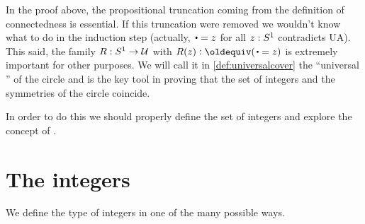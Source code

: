 In the proof above, the propositional truncation coming 
from the definition of connectedness is essential.
If this truncation were removed we wouldn't know what to do in
the induction step (actually, ${\base=z}$ for all $z:{S^1}$ contradicts UA).
This said, the family $R:{S^1}\to\mathcal{U}$ with $R(z)\defequi (\base=z)$ is extremely 
important for other purposes. We will call it in \cref{def:universalcover} the 
``universal \covering'' of the circle and is the key tool in proving that 
the set of integers and the symmetries of the circle coincide.

In order to do this we should properly define the set of integers 
and explore the concept of \coverings.

\section{The integers}
\label{sec:integers}

We define the type of integers in one of the many possible ways.


